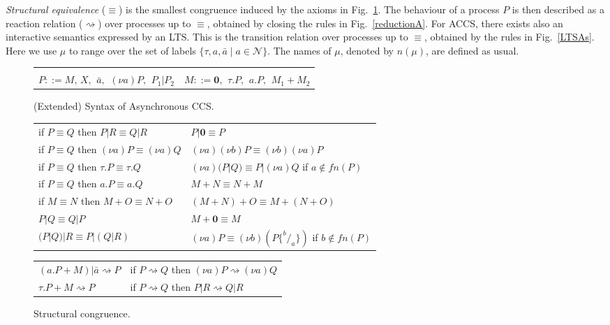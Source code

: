 \documentclass[copyright,creativecommons]{eptcs}
\newcommand{\nil}{\mathbf{0}}
\newcommand{\react}{\rightsquigarrow}
\newcommand{\<}{\langle}
\renewcommand{\>}{\rangle}
\begin{document}
\emph{Structural equivalence} ($\equiv$) is the smallest congruence
induced by the axioms in Fig.~\ref{congA}.
The behaviour of a process $P$ is then described as a reaction
relation ($\react$) over processes up to $\equiv$, obtained by
closing the rules in Fig.~\ref{reductionA}.
For ACCS, there exists also an interactive semantics
expressed by an LTS. This is the transition relation over processes
up to $\equiv$, obtained by the rules in Fig.~\ref{LTSAs}. Here we
use $\mu$ to range over the set of labels $\{\tau,a, \bar{a}\; |\;
a\in \mathcal N\}$. The names of $\mu$, denoted by $n(\mu)$, are
defined as usual.

\begin{figure}[!t]
\center
\begin{tabular}{p{7.3 cm} p{5 cm}}
\hline \\
$P ::= M,\, X,\, \ \bar{a},\, \ (\nu a)P,\, \ P_1 | P_2$   & $M ::= \nil,\, \ \tau.P,\, \ a.P,\, \  M_1 + M_2$ \bigskip\\
\hline
\end{tabular}
\caption{(Extended) Syntax of Asynchronous CCS.} \label{syntaxA}
\vspace{3mm}
\begin{tabular}{p{6 cm} p{6 cm}}
\hline
if $P \equiv Q$ then $P|R \equiv Q|R$ & $P|\nil \equiv P$\\
if $P \equiv Q$ then $(\nu a)P \equiv (\nu a)Q$ & $(\nu a)(\nu b)P \equiv (\nu b)(\nu a)P$\\
if $P \equiv Q$ then $\tau.P \equiv \tau.Q$ & $(\nu a)(P|Q) \equiv P|(\nu a)Q$ \hspace{3mm} if $a \notin fn(P)$\\
if $P \equiv Q$ then $a.P \equiv a.Q$ & $M+N \equiv N+M$ \\
if $M \equiv N$ then $M+O \equiv N+O$ & $(M+N)+O \equiv M+(N+O)$\\
$P|Q \equiv Q|P$ & $M+\nil \equiv M$ \\
$(P|Q)|R \equiv P|(Q|R)$ &  $(\nu a) P \equiv (\nu b)(P\lbrace ^b/_a \rbrace)$ \hspace{.75mm}if $b \notin fn(P)$\\
\hline
\end{tabular}
\caption{Structural congruence.}
\label{congA}
\vspace{3mm}
\begin{tabular}{p{6 cm} p{6 cm}}
\hline
$(a.P + M) | \bar{a} \react P$ & if  $P \react Q$ then  $(\nu a)P \react (\nu a)Q$\\
$\tau.P + M \react P$ & if  $P \react Q$  then  $P|R \react Q|R$ \\

\end{tabular}
\end{figure}
\end{document}
